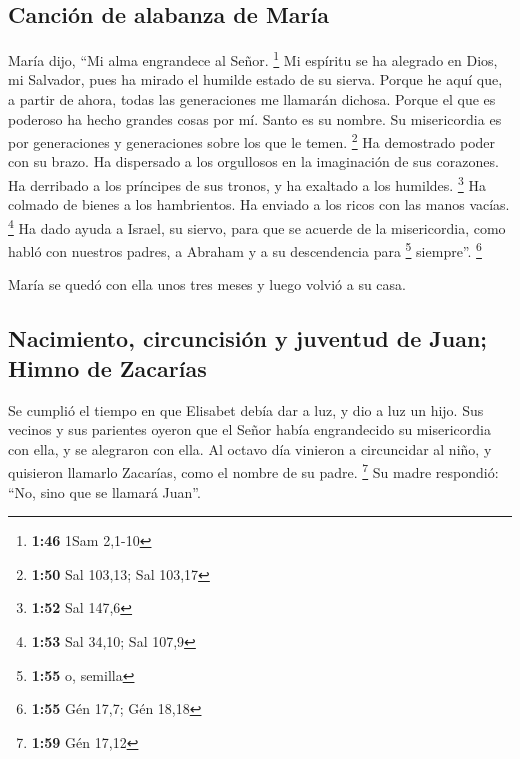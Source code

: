 \hypertarget{canciuxf3n-de-alabanza-de-maruxeda}{%
\subsection{Canción de alabanza de
María}\label{canciuxf3n-de-alabanza-de-maruxeda}}

 María dijo, ``Mi alma engrandece al Señor. \footnote{\textbf{1:46}
  1Sam 2,1-10}  Mi espíritu se ha alegrado en Dios, mi
Salvador,  pues ha mirado el humilde estado de su sierva.
Porque he aquí que, a partir de ahora, todas las generaciones me
llamarán dichosa.  Porque el que es poderoso ha hecho
grandes cosas por mí. Santo es su nombre.  Su
misericordia es por generaciones y generaciones sobre los que le temen.
\footnote{\textbf{1:50} Sal 103,13; Sal 103,17}  Ha
demostrado poder con su brazo. Ha dispersado a los orgullosos en la
imaginación de sus corazones.  Ha derribado a los
príncipes de sus tronos, y ha exaltado a los humildes. \footnote{\textbf{1:52}
  Sal 147,6}  Ha colmado de bienes a los hambrientos. Ha
enviado a los ricos con las manos vacías. \footnote{\textbf{1:53} Sal
  34,10; Sal 107,9}  Ha dado ayuda a Israel, su siervo,
para que se acuerde de la misericordia,  como habló con
nuestros padres, a Abraham y a su descendencia para \footnote{\textbf{1:55}
  o, semilla} siempre''. \footnote{\textbf{1:55} Gén 17,7; Gén 18,18}

 María se quedó con ella unos tres meses y luego volvió a
su casa.

\hypertarget{nacimiento-circuncisiuxf3n-y-juventud-de-juan-himno-de-zacaruxedas}{%
\subsection{Nacimiento, circuncisión y juventud de Juan; Himno de
Zacarías}\label{nacimiento-circuncisiuxf3n-y-juventud-de-juan-himno-de-zacaruxedas}}

 Se cumplió el tiempo en que Elisabet debía dar a luz, y
dio a luz un hijo.  Sus vecinos y sus parientes oyeron
que el Señor había engrandecido su misericordia con ella, y se alegraron
con ella.  Al octavo día vinieron a circuncidar al niño,
y quisieron llamarlo Zacarías, como el nombre de su padre. \footnote{\textbf{1:59}
  Gén 17,12}  Su madre respondió: ``No, sino que se
llamará Juan''.

